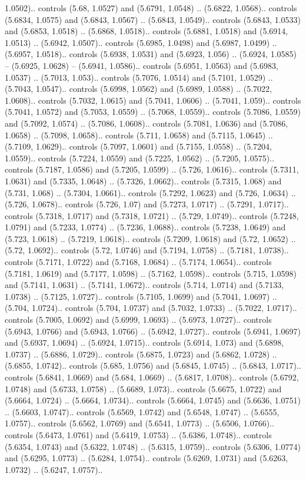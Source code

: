 1.0502).. controls (5.68, 1.0527) and (5.6791, 1.0548) .. (5.6822, 1.0568).. controls (5.6834, 1.0575) and (5.6843, 1.0567) .. (5.6843, 1.0549).. controls (5.6843, 1.0533) and (5.6853, 1.0518) .. (5.6868, 1.0518).. controls (5.6881, 1.0518) and (5.6914, 1.0513) .. (5.6942, 1.0507).. controls (5.6985, 1.0498) and (5.6987, 1.0499) .. (5.6957, 1.0518).. controls (5.6938, 1.0531) and (5.6923, 1.056) .. (5.6924, 1.0585) -- (5.6925, 1.0628) -- (5.6941, 1.0586).. controls (5.6951, 1.0563) and (5.6983, 1.0537) .. (5.7013, 1.053).. controls (5.7076, 1.0514) and (5.7101, 1.0529) .. (5.7043, 1.0547).. controls (5.6998, 1.0562) and (5.6989, 1.0588) .. (5.7022, 1.0608).. controls (5.7032, 1.0615) and (5.7041, 1.0606) .. (5.7041, 1.059).. controls (5.7041, 1.0572) and (5.7053, 1.0559) .. (5.7068, 1.0559).. controls (5.7086, 1.0559) and (5.7092, 1.0574) .. (5.7086, 1.0608).. controls (5.7081, 1.0636) and (5.7086, 1.0658) .. (5.7098, 1.0658).. controls (5.711, 1.0658) and (5.7115, 1.0645) .. (5.7109, 1.0629).. controls (5.7097, 1.0601) and (5.7155, 1.0558) .. (5.7204, 1.0559).. controls (5.7224, 1.0559) and (5.7225, 1.0562) .. (5.7205, 1.0575).. controls (5.7187, 1.0586) and (5.7205, 1.0599) .. (5.726, 1.0616).. controls (5.7311, 1.0631) and (5.7335, 1.0648) .. (5.7326, 1.0662).. controls (5.7315, 1.068) and (5.731, 1.068) .. (5.7304, 1.0661).. controls (5.7292, 1.0623) and (5.726, 1.0634) .. (5.726, 1.0678).. controls (5.726, 1.07) and (5.7273, 1.0717) .. (5.7291, 1.0717).. controls (5.7318, 1.0717) and (5.7318, 1.0721) .. (5.729, 1.0749).. controls (5.7248, 1.0791) and (5.7233, 1.0774) .. (5.7236, 1.0688).. controls (5.7238, 1.0649) and (5.723, 1.0618) .. (5.7219, 1.0618).. controls (5.7209, 1.0618) and (5.72, 1.0652) .. (5.72, 1.0692).. controls (5.72, 1.0746) and (5.7194, 1.0758) .. (5.7181, 1.0738).. controls (5.7171, 1.0722) and (5.7168, 1.0684) .. (5.7174, 1.0654).. controls (5.7181, 1.0619) and (5.7177, 1.0598) .. (5.7162, 1.0598).. controls (5.715, 1.0598) and (5.7141, 1.0631) .. (5.7141, 1.0672).. controls (5.714, 1.0714) and (5.7133, 1.0738) .. (5.7125, 1.0727).. controls (5.7105, 1.0699) and (5.7041, 1.0697) .. (5.704, 1.0724).. controls (5.704, 1.0737) and (5.7032, 1.0733) .. (5.7022, 1.0717).. controls (5.7005, 1.0692) and (5.6999, 1.0693) .. (5.6973, 1.0727).. controls (5.6943, 1.0766) and (5.6943, 1.0766) .. (5.6942, 1.0727).. controls (5.6941, 1.0697) and (5.6937, 1.0694) .. (5.6924, 1.0715).. controls (5.6914, 1.073) and (5.6898, 1.0737) .. (5.6886, 1.0729).. controls (5.6875, 1.0723) and (5.6862, 1.0728) .. (5.6855, 1.0742).. controls (5.685, 1.0756) and (5.6845, 1.0745) .. (5.6843, 1.0717).. controls (5.6841, 1.0669) and (5.684, 1.0669) .. (5.6817, 1.0708).. controls (5.6792, 1.0748) and (5.6733, 1.0758) .. (5.6689, 1.073).. controls (5.6675, 1.0722) and (5.6664, 1.0724) .. (5.6664, 1.0734).. controls (5.6664, 1.0745) and (5.6636, 1.0751) .. (5.6603, 1.0747).. controls (5.6569, 1.0742) and (5.6548, 1.0747) .. (5.6555, 1.0757).. controls (5.6562, 1.0769) and (5.6541, 1.0773) .. (5.6506, 1.0766).. controls (5.6473, 1.0761) and (5.6419, 1.0753) .. (5.6386, 1.0748).. controls (5.6354, 1.0743) and (5.6322, 1.0748) .. (5.6315, 1.0759).. controls (5.6306, 1.0774) and (5.6295, 1.0773) .. (5.6284, 1.0754).. controls (5.6269, 1.0731) and (5.6263, 1.0732) .. (5.6247, 1.0757).. 